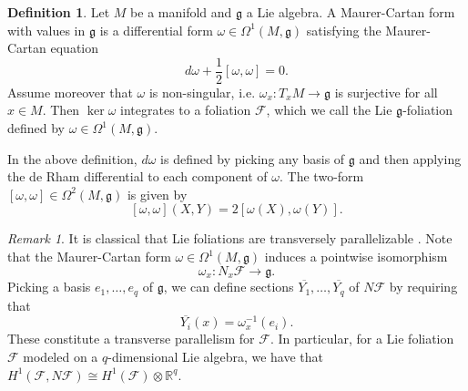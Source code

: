 \documentclass[11pt, letterpaper, oneside,reqno]{amsart}
\theoremstyle{plain}
\theoremstyle{underline}
\theoremstyle{definition}
\newtheorem{defi}[thm]{Definition}
\theoremstyle{remark}
\newtheorem{remark}[thm]{Remark}
\begin{document}
	\begin{defi}\label{def:Lie}
		Let $M$ be a manifold and $\mathfrak{g}$ a Lie algebra. A Maurer-Cartan form with values in $\mathfrak{g}$ is a differential form $\omega\in\Omega^{1}(M,\mathfrak{g})$ satisfying the Maurer-Cartan equation
		\begin{equation}\label{eq:MC}
			d\omega+\frac{1}{2}[\omega,\omega]=0.
		\end{equation}
		Assume moreover that $\omega$ is non-singular, i.e. $\omega_x:T_{x}M\rightarrow\mathfrak{g}$ is surjective for all $x\in M$. Then  $\ker\omega$ integrates to a foliation $\mathcal{F}$, which we call the Lie $\mathfrak{g}$-foliation defined by $\omega\in\Omega^{1}(M,\mathfrak{g})$.
	\end{defi}
	
	In the above definition, $d\omega$ is defined by picking any basis of $\mathfrak{g}$ and then applying the de Rham differential to each component of $\omega$. The two-form $[\omega,\omega]\in \Omega^{2}(M,\mathfrak{g})$ is given by
	\[
	[\omega,\omega](X,Y)=2[\omega(X),\omega(Y)].
	\]
	
	\begin{remark}\label{remark: trivialization}
		It is classical that Lie foliations are transversely parallelizable \cite[Prop.~4.21]{Moerdijk}. Note that the Maurer-Cartan form $\omega\in\Omega^{1}(M,\mathfrak{g})$ induces a pointwise isomorphism
		\[
		\omega_x:N_{x}\mathcal{F}\rightarrow\mathfrak{g}.
		\]
		Picking a basis $e_1,\ldots,e_q$ of $\mathfrak{g}$, we can define sections $\overline{Y_1},\ldots,\overline{Y_q}$ of $N\mathcal{F}$ by requiring that
		\[
		\overline{Y_i}(x)=\omega_{x}^{-1}(e_i).
		\]
		These constitute a transverse parallelism for $\mathcal{F}$. In particular, for a Lie foliation $\mathcal{F}$ modeled on a $q$-dimensional Lie algebra, we have that $H^{1}(\mathcal{F},N\mathcal{F})\cong H^{1}(\mathcal{F})\otimes\mathbb{R}^{q}$.
	\end{remark}
	
\end{document}
